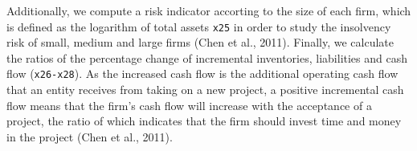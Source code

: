 \documentclass{article}
\begin{document}
 Additionally, we compute a risk indicator accorting to the size of each firm, which is defined as the logarithm of total assets \texttt{x25} in order to study the insolvency risk of small, medium and large firms (Chen et al., 2011). Finally, we calculate the ratios of the percentage change of incremental inventories, liabilities and cash flow (\texttt{x26-x28}). As the increased cash flow is the additional operating cash flow that an entity receives from taking on a new project, a positive incremental cash flow means that the firm's cash flow will increase with the acceptance of a project, the ratio of which indicates that the firm should invest time and money in the project (Chen et al., 2011). 


\end{document}
